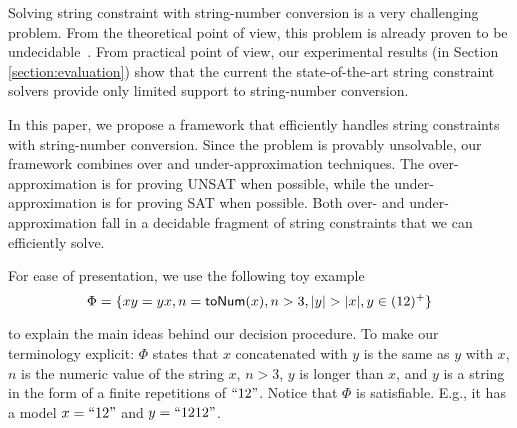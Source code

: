 \documentclass[sigplan,review,anonymous]{acmart}\settopmatter{printfolios=true,printccs=false,printacmref=false}
\begin{document}


Solving string constraint with string-number conversion is a very challenging problem. From the theoretical point of view, this problem is already proven to be undecidable~\cite{day2018satisfiability}. From practical point of view, 
 our experimental results  (in Section \ref{section:evaluation}) show that the current  the state-of-the-art string constraint solvers provide only limited support to string-number conversion. 


In this paper, we propose a framework that efficiently handles string constraints with string-number conversion. Since the problem is provably unsolvable, our framework combines over and under-approximation techniques. The over-approximation is for proving UNSAT when possible, while the under-approximation is for proving SAT when possible. Both over- and under-approximation fall in a decidable fragment of string constraints that  we can efficiently solve. 



For ease of presentation, we  use the following toy example $$\Phi = \{xy=yx, n = \sti{x}, n >3 ,|y|>|x|, y \in (12)^+\}$$

to explain the main ideas behind our decision procedure.  To make our terminology explicit: $\Phi$ states that $x$ concatenated with $y$ is the same as $y$ with $x$, $n$ is the numeric value of the string $x$, $n > 3$, $y$ is longer than $x$, and $y$ is a string in the form of a finite repetitions of $``12"$.  Notice that $\Phi$ is satisfiable. E.g., it has a model $x=``12"$ and $y=``1212"$.
\end{document}
